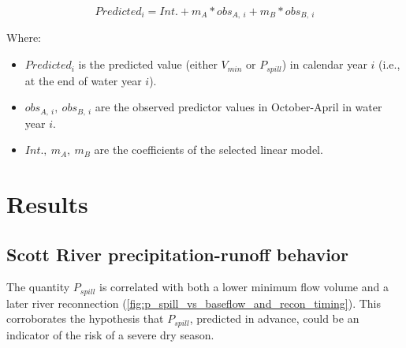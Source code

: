 \documentclass[hess, manuscript]{copernicus}
\providecommand{\tightlist}{%
  \setlength{\itemsep}{0pt}\setlength{\parskip}{0pt}}
\begin{document}
\begin{equation}
Predicted_{i} = Int. + m_A * obs_{A,~i}+m_B*obs_{B,~i}
\end{equation}

Where:

\begin{itemize}
\tightlist
\item
  \(Predicted_i\) is the predicted value (either \(V_{min}\) or
  \(P_{spill}\)) in calendar year \(i\) (i.e., at the end of water year
  \(i\)).
\item
  \(obs_{A,~i},~obs_{B,~i}\) are the observed predictor values in
  October-April in water year \(i\).
\item
  \(Int.,~m_A,~m_B\) are the coefficients of the selected linear model.
\end{itemize}

\section{Results}

\subsection{Scott River precipitation-runoff behavior}

The quantity \(P_{spill}\) is correlated with both a lower minimum flow
volume and a later river reconnection
(\autoref{fig:p_spill_vs_baseflow_and_recon_timing}). This corroborates
the hypothesis that \(P_{spill}\), predicted in advance, could be an
indicator of the risk of a severe dry season.
\end{document}

